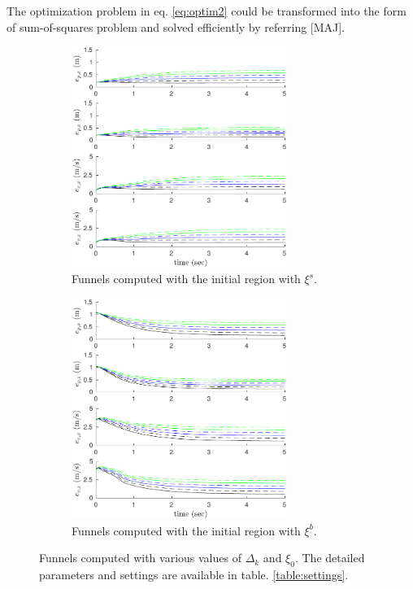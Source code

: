 \documentclass[letterpaper, 10 pt, conference]{ieeeconf}  %
\begin{document}
The optimization problem in eq. \eqref{eq:optim2} could be transformed into the form of sum-of-squares problem and solved efficiently by referring [MAJ].
\begin{figure}[t]
\begin{subfigure}[b]{0.5\textwidth}
\centering
\includegraphics[width=7.0cm]{smaller.pdf}
\caption{Funnels computed with the initial region with $\xi^s$.}
\end{subfigure}
\begin{subfigure}[b]{0.5\textwidth}
\centering
\includegraphics[width=7.0cm]{bigger.pdf}
\caption{Funnels computed with the initial region with $\xi^b$.}
\end{subfigure}
\caption{
Funnels computed with various values of $\Delta_k$ and $\xi_0$. The detailed parameters and settings are available in table. \ref{table:settings}. }
\label{fig:funnelSamples}
\end{figure}
\end{document}
